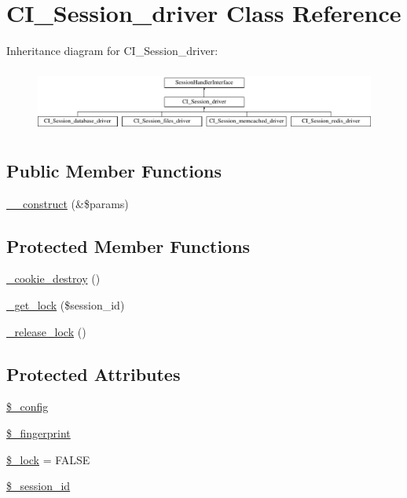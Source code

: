 \hypertarget{class_c_i___session__driver}{}\section{C\+I\+\_\+\+Session\+\_\+driver Class Reference}
\label{class_c_i___session__driver}
Inheritance diagram for C\+I\+\_\+\+Session\+\_\+driver\+:\begin{figure}[H]
\begin{center}
\leavevmode
\includegraphics[height=2.121212cm]{class_c_i___session__driver}
\end{center}
\end{figure}
\subsection*{Public Member Functions}
\begin{DoxyCompactItemize}
\item 
\hyperlink{class_c_i___session__driver_ac1669c73d53d6f16cf5459a1e84d39c8}{\+\_\+\+\_\+construct} (\&\$params)
\end{DoxyCompactItemize}
\subsection*{Protected Member Functions}
\begin{DoxyCompactItemize}
\item 
\hyperlink{class_c_i___session__driver_a36771b622e8a8928c1c931ac56c12434}{\+\_\+cookie\+\_\+destroy} ()
\item 
\hyperlink{class_c_i___session__driver_a2c49c8e23be3e2aca96a9d20de18ffc2}{\+\_\+get\+\_\+lock} (\$session\+\_\+id)
\item 
\hyperlink{class_c_i___session__driver_a0265e356e6cf1eaba229663c1664c37d}{\+\_\+release\+\_\+lock} ()
\end{DoxyCompactItemize}
\subsection*{Protected Attributes}
\begin{DoxyCompactItemize}
\item 
\hyperlink{class_c_i___session__driver_a4d4ad4af1600438042f93a4492f8dbbe}{\$\+\_\+config}
\item 
\hyperlink{class_c_i___session__driver_ac926edb2847b6610e253be83270c2cc2}{\$\+\_\+fingerprint}
\item 
\hyperlink{class_c_i___session__driver_a1cfb8ce1d225fe600a6a034d685b8ff6}{\$\+\_\+lock} = F\+A\+L\+S\+E
\item 
\hyperlink{class_c_i___session__driver_a92023c94926d17b1f6705c8b1d35a103}{\$\+\_\+session\+\_\+id}
\end{DoxyCompactItemize}


